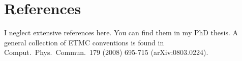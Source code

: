 \documentclass[a4paper]{article}
\begin{document}
\section{References}
I neglect extensive references here. You can find them in my PhD thesis. A general collection of ETMC conventions is found in Comput.\ Phys.\ Commun.\ 179 (2008) 695-715 (arXiv:0803.0224).
\end{document}
